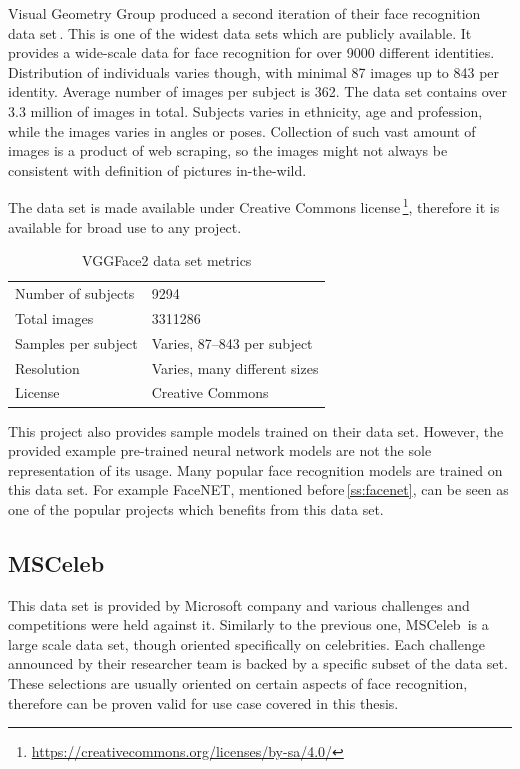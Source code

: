 Visual Geometry Group produced a second iteration of their face recognition data set\,\cite{VVGFace2}. This is one of the widest data sets which are publicly available. It provides a wide-scale data for face recognition for over 9000 different identities. Distribution of individuals varies though, with minimal 87 images up to 843 per identity. Average number of images per subject is 362. The data set contains over \num{3.3} million of images in total. Subjects varies in ethnicity, age and profession, while the images varies in angles or poses. Collection of such vast amount of images is a product of web scraping, so the images might not always be consistent with definition of pictures in-the-wild.

The data set is made available under Creative Commons license\,\footnote{\url{https://creativecommons.org/licenses/by-sa/4.0/}}, therefore it is available for broad use to any project.

\begin{table}[ht]
    \centering
    \caption{VGGFace2 data set metrics}

    \begin{tabularx}{.8\textwidth}{l|X}
        \toprule
        Number of subjects & \num{9294} \\
        Total images & \num{3311286} \\
        Samples per subject & Varies, 87--843 per subject \\
        Resolution & Varies, many different sizes \\
        License & Creative Commons \\
        \bottomrule
    \end{tabularx}
\end{table}

This project also provides sample models trained on their data set. However, the provided example pre-trained neural network models are not the sole representation of its usage. Many popular face recognition models are trained on this data set. For example FaceNET, mentioned before\,\ref{ss:facenet}, can be seen as one of the popular projects which benefits from this data set.

\subsection{MSCeleb}

This data set is provided by Microsoft company and various challenges and competitions were held against it. Similarly to the previous one, MSCeleb\,\cite{msceleb} is a large scale data set, though oriented specifically on celebrities. Each challenge announced by their researcher team is backed by a specific subset of the data set. These selections are usually oriented on certain aspects of face recognition, therefore can be proven valid for use case covered in this thesis.

